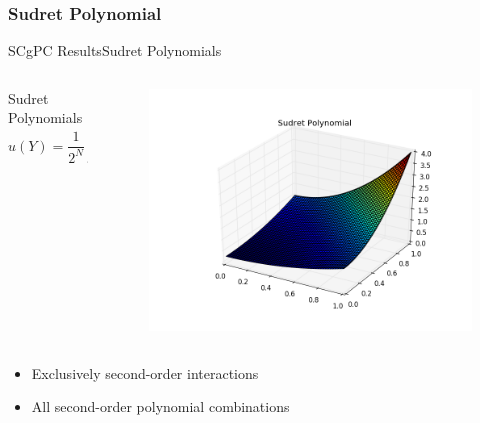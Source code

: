 \documentclass{beamer}
\begin{document}
\subsubsection{Sudret Polynomial}
\begin{frame}{SCgPC Results}{Sudret Polynomials}\vspace{-20pt}
  \begin{columns}
    \begin{column}{0.6\textwidth}
      \begin{block}{Sudret Polynomials}
        \[u(Y) = \frac{1}{2^N}\prod_{n=1}^N (3y_n^2+1)\]
      \end{block}
    \end{column}
    \begin{column}{0.4\textwidth}
        \begin{figure}[h!]
          \centering
          \includegraphics[width=\linewidth]{anlmodels/sudret}
        \end{figure}
    \end{column}
  \end{columns}
  \begin{itemize}
    \item Exclusively second-order interactions
    \item All second-order polynomial combinations
  \end{itemize}
\end{frame}
\end{document}
